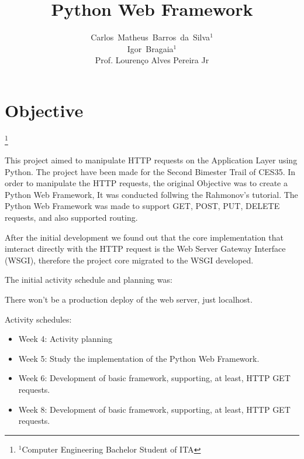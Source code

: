 \documentclass[journal,12pt,onecolumn,draftclsnofoot,]{IEEEtran}
\newcommand\blfootnote[1]{%
  \begingroup
  \renewcommand\thefootnote{}\footnote{#1}%
  \addtocounter{footnote}{-1}%
  \endgroup
}
\begin{document}
\title{Python Web Framework}
\author{Carlos~Matheus~Barros~da~Silva$^1$
\\
Igor~Bragaia$^1$
\\
Prof. Lourenço Alves Pereira Jr}
\maketitle

\IEEEpeerreviewmaketitle



\section{Objective}
\blfootnote{$^1$Computer Engineering Bachelor Student of ITA}

This project aimed to manipulate HTTP requests on the Application Layer using Python. The project have been made for the Second Bimester Trail of CES35. In order to manipulate the HTTP requests, the original Objective was to create a Python Web Framework, It was conducted follwing the Rahmonov's tutorial\cite{c1}\cite{c2}\cite{c3}. The Python Web Framework was made to support GET, POST, PUT, DELETE requests, and also supported routing.

After the initial development we found out that the core implementation that imteract directly with the HTTP request is the Web Server Gateway Interface (WSGI), therefore the project core migrated to the WSGI developed.

The initial activity schedule and planning was:

There won't be a production deploy of the web server, just localhost.

Activity schedules:

\begin{itemize}
    \item Week 4: Activity planning
    \item Week 5: Study the implementation of the Python Web Framework.
    \item Week 6: Development of basic framework, supporting, at least, HTTP GET requests.
    \item Week 8: Development of basic framework, supporting, at least, HTTP GET requests.
\end{itemize}
\end{document}
